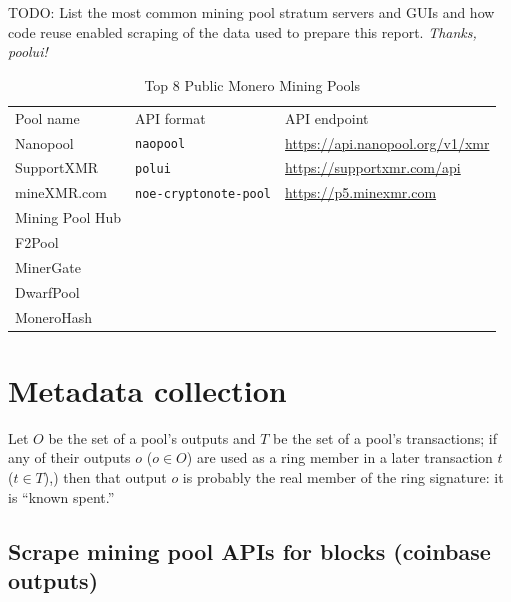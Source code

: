 \documentclass[notitlepage]{report}
\begin{document}
TODO: List the most common mining pool stratum servers and GUIs and how code reuse enabled scraping of the data used to prepare this report.  \textit{Thanks, poolui!}


\begin{table}[h]
\centering
\caption{Top 8 Public Monero Mining Pools}
\begin{tabular}{lll}
Pool name       & API format                   & API endpoint                          \\ 
Nanopool        & \texttt{naopool}             & \url{https://api.nanopool.org/v1/xmr} \\ 
SupportXMR      & \texttt{polui}               & \url{https://supportxmr.com/api}      \\ 
mineXMR.com     & \texttt{noe-cryptonote-pool} & \url{https://p5.minexmr.com}          \\ 
Mining Pool Hub &                              &                                       \\
F2Pool          &                              &                                       \\
MinerGate       &                              &                                       \\
DwarfPool       &                              &                                       \\
MoneroHash      &                              &                                 
\end{tabular}
\label{table:top-8-pools}
\end{table}


\section{Metadata collection}
\setcounter{chapter}{3}

Let $O$ be the set of a pool's outputs and $T$ be the set of a pool's transactions; if any of their outputs $o$ ($o \in O$) are used as a ring member in a later transaction $t$ ($t \in T$),) then that output $o$ is probably the real member of the ring signature: it is ``known spent.''

\subsection{Scrape mining pool APIs for blocks (coinbase outputs)}
\end{document}
